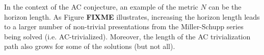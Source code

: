 In the context of the AC conjecture, an example of the metric $N$ can be the horizon length. As Figure {\bf FIXME} illustrates, increasing the horizon length leads to a larger number of non-trivial presentations from the Miller-Schupp series being solved (i.e. AC-trivialized). Moreover, the length of the AC trivialization path also grows for some of the solutions (but not all).
